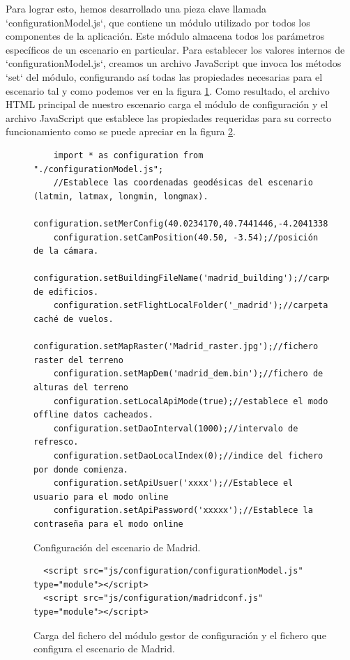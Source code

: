 \documentclass[a4paper, 11pt]{book}
\begin{document}
Para lograr esto, hemos desarrollado una pieza clave llamada `configurationModel.js`, que contiene un módulo utilizado por todos los componentes de la aplicación. Este módulo almacena todos los parámetros específicos de un escenario en particular. Para establecer los valores internos de `configurationModel.js`, creamos un archivo JavaScript que invoca los métodos `set` del módulo, configurando así todas las propiedades necesarias para el escenario tal y como podemos ver en la figura \ref{codigo:madridConf}. Como resultado, el archivo HTML principal de nuestro escenario carga el módulo de configuración y el archivo JavaScript que establece las propiedades requeridas para su correcto funcionamiento como se puede apreciar en la figura \ref{codigo:cargaConfiguracion}.
\begin{figure}[h]
\centering
\begin{verbatim}
    import * as configuration from "./configurationModel.js";
    //Establece las coordenadas geodésicas del escenario (latmin, latmax, longmin, longmax).
    configuration.setMerConfig(40.0234170,40.7441446,-4.2041338,-3.2538165);
    configuration.setCamPosition(40.50, -3.54);//posición de la cámara.
    configuration.setBuildingFileName('madrid_building');//carpeta de edificios.
    configuration.setFlightLocalFolder('_madrid');//carpeta caché de vuelos.
    configuration.setMapRaster('Madrid_raster.jpg');//fichero raster del terreno
    configuration.setMapDem('madrid_dem.bin');//fichero de alturas del terreno
    configuration.setLocalApiMode(true);//establece el modo offline datos cacheados.
    configuration.setDaoInterval(1000);//intervalo de refresco.
    configuration.setDaoLocalIndex(0);//indice del fichero por donde comienza.
    configuration.setApiUsuer('xxxx');//Establece el usuario para el modo online
    configuration.setApiPassword('xxxxx');//Establece la contraseña para el modo online
\end{verbatim}
\caption{Configuración del escenario de Madrid.
\label{codigo:madridConf}}
\end{figure}
\begin{figure}[h]
\centering
\begin{verbatim}
  <script src="js/configuration/configurationModel.js" type="module"></script>
  <script src="js/configuration/madridconf.js" type="module"></script>
\end{verbatim}
\caption{Carga del fichero del módulo gestor de configuración y el fichero que configura el escenario de Madrid.
\label{codigo:cargaConfiguracion}}
\end{figure}
\end{document}
